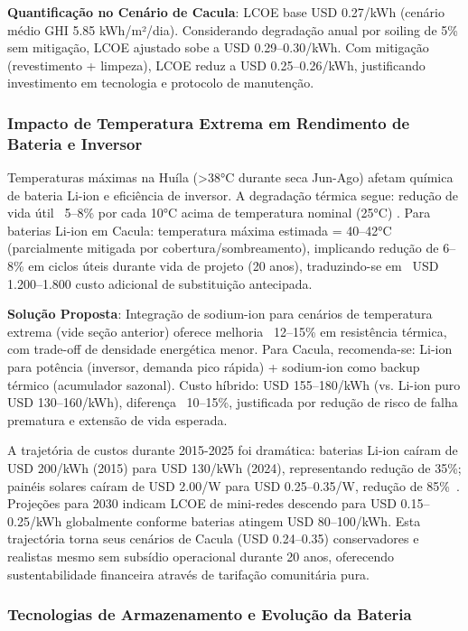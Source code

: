 \documentclass[12pt, a4paper]{article}
\begin{document}
\textbf{Quantificação no Cenário de Cacula}: LCOE base USD 0.27/kWh (cenário médio GHI 5.85 kWh/m²/dia). Considerando degradação anual por soiling de 5\% sem mitigação, LCOE ajustado sobe a USD 0.29--0.30/kWh. Com mitigação (revestimento + limpeza), LCOE reduz a USD 0.25--0.26/kWh, justificando investimento em tecnologia e protocolo de manutenção.

\subsubsection{Impacto de Temperatura Extrema em Rendimento de Bateria e Inversor}

Temperaturas máximas na Huíla (>38°C durante seca Jun-Ago) afetam química de bateria Li-ion e eficiência de inversor. A degradação térmica segue: redução de vida útil ~5--8\% por cada 10°C acima de temperatura nominal (25°C) \citep{Mukhopadhyay2025}. Para baterias Li-ion em Cacula: temperatura máxima estimada = 40--42°C (parcialmente mitigada por cobertura/sombreamento), implicando redução de 6--8\% em ciclos úteis durante vida de projeto (20 anos), traduzindo-se em ~USD 1.200--1.800 custo adicional de substituição antecipada.

\textbf{Solução Proposta}: Integração de sodium-ion para cenários de temperatura extrema (vide seção anterior) oferece melhoria ~12--15\% em resistência térmica, com trade-off de densidade energética menor. Para Cacula, recomenda-se: Li-ion para potência (inversor, demanda pico rápida) + sodium-ion como backup térmico (acumulador sazonal). Custo híbrido: USD 155--180/kWh (vs. Li-ion puro USD 130--160/kWh), diferença ~10--15\%, justificada por redução de risco de falha prematura e extensão de vida esperada.

A trajetória de custos durante 2015-2025 foi dramática: baterias Li-ion caíram de USD 200/kWh (2015) para USD 130/kWh (2024), representando redução de 35\%; painéis solares caíram de USD 2.00/W para USD 0.25--0.35/W, redução de 85\%~\citep{Schmidt2021}. Projeções para 2030 indicam LCOE de mini-redes descendo para USD 0.15--0.25/kWh globalmente conforme baterias atingem USD 80--100/kWh. Esta trajectória torna seus cenários de Cacula (USD 0.24--0.35) conservadores e realistas mesmo sem subsídio operacional durante 20 anos, oferecendo sustentabilidade financeira através de tarifação comunitária pura.

\subsubsection{Tecnologias de Armazenamento e Evolução da Bateria}
\end{document}
